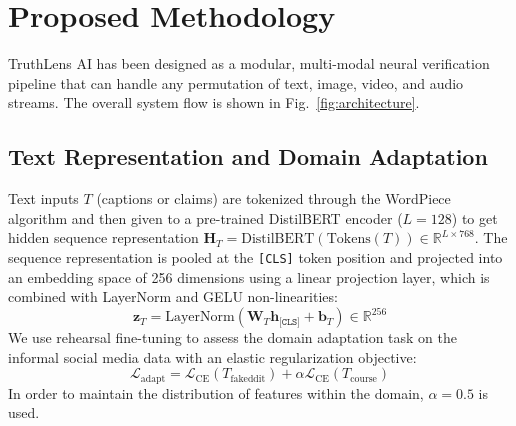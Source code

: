 \documentclass[conference]{IEEEtran}
\begin{document}
\section{Proposed Methodology}
TruthLens AI has been designed as a modular, multi-modal neural verification pipeline that can handle any permutation of text, image, video, and audio streams. The overall system flow is shown in Fig.~\ref{fig:architecture}.

\subsection{Text Representation and Domain Adaptation}
Text inputs $T$ (captions or claims) are tokenized through the WordPiece algorithm and then given to a pre-trained DistilBERT encoder \cite{sanh2019distilbert} ($L = 128$) to get hidden sequence representation $\mathbf{H}_T = \text{DistilBERT}(\text{Tokens}(T)) \in \mathbb{R}^{L \times 768}$. The sequence representation is pooled at the \texttt{[CLS]} token position and projected into an embedding space of 256 dimensions using a linear projection layer, which is combined with LayerNorm and GELU non-linearities:
\begin{equation}
\mathbf{z}_T = \text{LayerNorm}(\mathbf{W}_T \mathbf{h}_{\texttt{[CLS]}} + \mathbf{b}_T) \in \mathbb{R}^{256}
\end{equation}
We use rehearsal fine-tuning to assess the domain adaptation task on the informal social media data with an elastic regularization objective:
\begin{equation}
\mathcal{L}_{\text{adapt}} = \mathcal{L}_{\text{CE}}(T_{\text{fakeddit}}) + \alpha \mathcal{L}_{\text{CE}}(T_{\text{course}})
\end{equation}
In order to maintain the distribution of features within the domain, $\alpha = 0.5$ is used.
\end{document}
